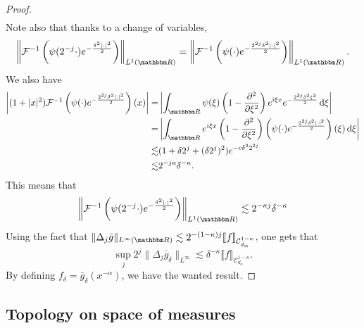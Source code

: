 \documentclass[a4paper,11pt, reqno]{amsart}
\newcommand{\cC}{\mathcal{C}}	\newcommand{\CC}{\mathbbm{C}}
\newcommand{\cF}{\mathcal{F}}	\newcommand{\FF}{\mathbbm{F}}
\newcommand{\dd}{\mathop{}\!\mathrm{d}}
\newcommand{\1}{\mathbbm{1}}
\theoremstyle{plain}
\newtheorem{remark}[theorem]{Remark}
\theoremstyle{definition}
\begin{document}
\begin{proof}
\begin{align*}
    \end{align*}
    Note also that thanks to a change of variables,  
    \[\left\| \cF^{-1}\left(\psi(2^{-j} \cdot) e^{-\frac{\delta^2 |\cdot|^2}{2}}\right)\right\|_{L^1(\RR)} = \left\| \cF^{-1}\left(\psi( \cdot) e^{-\frac{ 2^{2j}\delta^2 |\cdot|^2}{2}}\right)\right\|_{L^1(\RR)}.\]
    We also have 
    \begin{align*}
        \left|(1+|x|^2)\cF^{-1}\left(\psi( \cdot) e^{-\frac{2^{2j}\delta^2 |\cdot|^2}{2}}\right)(x)\right|
        = & \left|  \int_{\RR} \psi(\xi) \left(1-\frac{\partial^2 }{\partial \xi^2}\right)e^{i\xi x} e^{-\frac{2^{2j}\delta^2 \xi^2}{2}} \dd \xi\right| \\
        =& \left|  \int_{\RR} e^{i\xi x} \left(1-\frac{\partial^2}{\partial\xi^2}\right) \left(\psi(\cdot) e^{-\frac{2^{2j}\delta^2 |\cdot|^2}{2}} \right)(\xi) \dd \xi\right| \\
        \lesssim & (1+\delta 2^j+(\delta 2^j)^2) e^{-c\delta^2 2^{2j}} \\
        \lesssim & 2^{-j\kappa} \delta^{-\kappa}.
    \end{align*}
    This means that 
    \[\left\| \cF^{-1}\left(\psi(2^{-j} \cdot) e^{-\frac{\delta^2 |\cdot|^2}{2}}\right)\right\|_{L^1(\RR)} \lesssim 2^{-\kappa j} \delta^{-\kappa}\]
    Using the fact that $\|\Delta_j \bar{g}\|_{L^\infty(\RR)} \lesssim 2^{-(1-\kappa )j} \llbracket f \rrbracket_{\cC^{1-\kappa}_{d_\alpha}}$, one gets that 
    \[\sup_j 2^{j}\|\Delta_j \bar{g}_\delta\|_{L^\infty} \lesssim \delta^{-\kappa} \llbracket f \rrbracket_{\cC^{1-\kappa}_{d_\alpha}}.\]
    By defining $f_\delta = \bar{g}_\delta(x^{-\alpha})$, we have the wanted result. 
\end{proof}


\subsection{Topology on space of measures}
\end{document}
